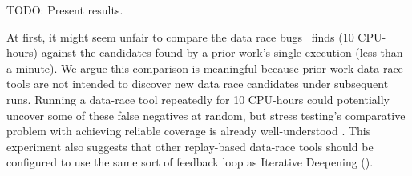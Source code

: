 TODO: Present results.

At first, it might seem unfair to compare the data race bugs \quicksand~finds (10 CPU-hours)
against the candidates found by a prior work's single execution (less than a minute).
We argue this comparison is meaningful because prior work data-race tools %
are not intended to discover new data race candidates under subsequent runs. %
Running a data-race tool repeatedly for 10 CPU-hours could potentially uncover some of these false negatives at random,
but stress testing's comparative problem with achieving reliable coverage is already well-understood
\cite{chess-icb,gambit}.
This experiment also suggests that
other replay-based data-race tools \cite{racefuzzer,portend} should be configured to use the same sort of feedback loop as Iterative Deepening (\sect{\ref{sec:related-dr}}).



